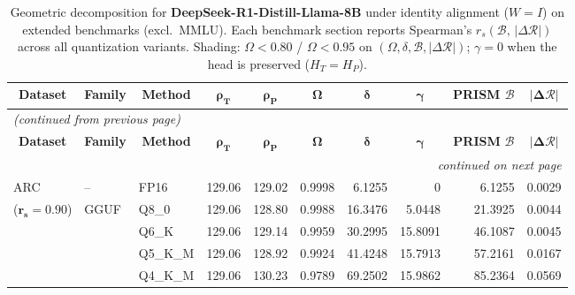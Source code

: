 \begingroup
\small
\setlength{\tabcolsep}{4pt}
\renewcommand{\arraystretch}{1.05}
\setlength{\LTcapwidth}{\textwidth}
\begin{longtable}{ll l rrrrrrr}
\caption{Geometric decomposition for \textbf{DeepSeek-R1-Distill-Llama-8B} under identity alignment ($W{=}I$) on extended benchmarks (excl.\ MMLU). Each benchmark section reports Spearman's $r_s(\mathcal{B},\,|\Delta\mathcal{R}|)$ across all quantization variants. Shading: \colorbox{red!35}{$\Omega{<}0.80$} / \colorbox{red!18}{$\Omega{<}0.95$} on $(\Omega,\delta,\mathcal{B},|\Delta\mathcal{R}|)$; \colorbox{cyan!12}{$\gamma{=}0$} when the head is preserved ($H_T{=}H_P$).}\label{tab:deepseek_decomposition_ext_bound}\\
\toprule
\multicolumn{1}{c}{\textbf{Dataset}} & \multicolumn{1}{c}{\textbf{Family}} & \multicolumn{1}{c}{\textbf{Method}} & \multicolumn{1}{c}{$\boldsymbol{\rho_T}$} & \multicolumn{1}{c}{$\boldsymbol{\rho_P}$} & \multicolumn{1}{c}{$\boldsymbol{\Omega}$} & \multicolumn{1}{c}{$\boldsymbol{\delta}$} & \multicolumn{1}{c}{$\boldsymbol{\gamma}$} & \multicolumn{1}{c}{\textbf{PRISM} $\boldsymbol{\mathcal{B}}$} & \multicolumn{1}{c}{$\boldsymbol{|\Delta\mathcal{R}|}$} \\
\midrule
\endfirsthead
\multicolumn{10}{l}{\small\itshape (continued from previous page)}\\
\toprule
\multicolumn{1}{c}{\textbf{Dataset}} & \multicolumn{1}{c}{\textbf{Family}} & \multicolumn{1}{c}{\textbf{Method}} & \multicolumn{1}{c}{$\boldsymbol{\rho_T}$} & \multicolumn{1}{c}{$\boldsymbol{\rho_P}$} & \multicolumn{1}{c}{$\boldsymbol{\Omega}$} & \multicolumn{1}{c}{$\boldsymbol{\delta}$} & \multicolumn{1}{c}{$\boldsymbol{\gamma}$} & \multicolumn{1}{c}{\textbf{PRISM} $\boldsymbol{\mathcal{B}}$} & \multicolumn{1}{c}{$\boldsymbol{|\Delta\mathcal{R}|}$} \\
\midrule
\endhead
\midrule
\multicolumn{10}{r}{\small\itshape continued on next page}\\
\endfoot
\bottomrule
\endlastfoot
ARC & -- & FP16 & 129.06 & 129.02 & 0.9998 & 6.1255 & \cellcolor{cyan!12} $0$ & 6.1255 & 0.0029 \\
{\small ($\mathbf{r_s{=}0.90}$)} & GGUF & Q8\_0 & 129.06 & 128.80 & 0.9988 & 16.3476 & 5.0448 & 21.3925 & 0.0044 \\
 &  & Q6\_K & 129.06 & 129.14 & 0.9959 & 30.2995 & 15.8091 & 46.1087 & 0.0045 \\
 &  & Q5\_K\_M & 129.06 & 128.92 & 0.9924 & 41.4248 & 15.7913 & 57.2161 & 0.0167 \\
 &  & Q4\_K\_M & 129.06 & 130.23 & 0.9789 & 69.2502 & 15.9862 & 85.2364 & 0.0569 \\

\end{longtable}
